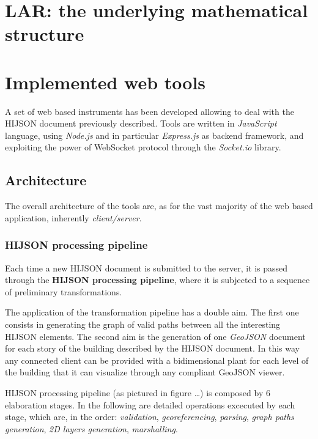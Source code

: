 \documentclass{sig-alternate}
\begin{document}
\section{LAR: the underlying mathematical structure}\label{lar-the-underlying-mathematical-structure}

\section{Implemented web tools}\label{implemented-web-tools}

A set of web based instruments has been developed allowing to deal with
the HIJSON document previously described. Tools are written in
\emph{JavaScript} language, using \emph{Node.js} and in particular
\emph{Express.js} as backend framework, and exploiting the power of
WebSocket protocol through the \emph{Socket.io} library.

\subsection{Architecture}\label{architecture}

The overall architecture of the tools are, as for the vast majority of
the web based application, inherently \emph{client/server}.

\subsubsection{HIJSON processing pipeline}\label{hijson-processing-pipeline}

Each time a new HIJSON document is submitted to the server, it is passed
through the \textbf{HIJSON processing pipeline}, where it is subjected
to a sequence of preliminary transformations.

The application of the transformation pipeline has a double aim. The
first one consists in generating the graph of valid paths between all
the interesting HIJSON elements. The second aim is the generation of one
\emph{GeoJSON} document for each story of the building described by the
HIJSON document. In this way any connected client can be provided with a
bidimensional plant for each level of the building that it can visualize
through any compliant GeoJSON viewer.

HIJSON processing pipeline (as pictured in figure \ldots{}) is composed
by 6 elaboration stages. In the following are detailed operations
excecuted by each stage, which are, in the order: \emph{validation},
\emph{georeferencing}, \emph{parsing}, \emph{graph paths generation},
\emph{2D layers generation}, \emph{marshalling}.
\end{document}
